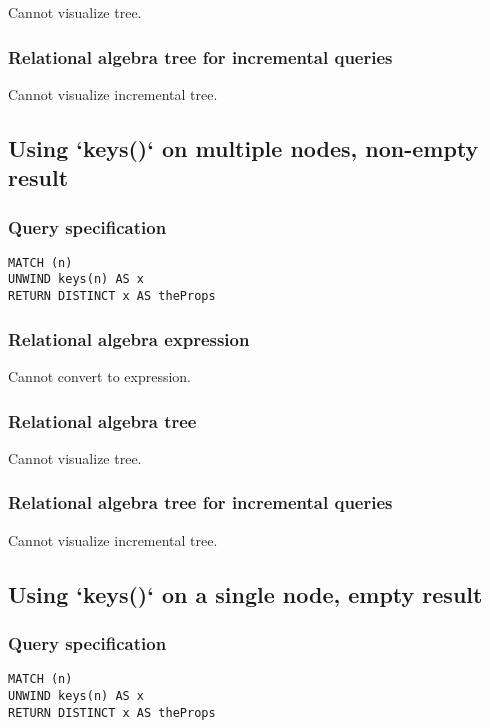 Cannot visualize tree.

\subsubsection*{Relational algebra tree for incremental queries}

Cannot visualize incremental tree.

\subsection{Using `keys()` on multiple nodes, non-empty result}

\subsubsection*{Query specification}

\begin{lstlisting}
MATCH (n)
UNWIND keys(n) AS x
RETURN DISTINCT x AS theProps
\end{lstlisting}

\subsubsection*{Relational algebra expression}

Cannot convert to expression.

\subsubsection*{Relational algebra tree}

Cannot visualize tree.

\subsubsection*{Relational algebra tree for incremental queries}

Cannot visualize incremental tree.

\subsection{Using `keys()` on a single node, empty result}

\subsubsection*{Query specification}

\begin{lstlisting}
MATCH (n)
UNWIND keys(n) AS x
RETURN DISTINCT x AS theProps
\end{lstlisting}

